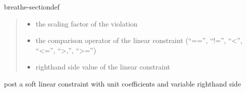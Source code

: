 \documentclass[letterpaper,10pt,openany,oneside,english]{sphinxmanual}
\begin{document}
\begin{fulllineitems}
\begin{sphinxuseclass}{breathe-sectiondef}
\begin{fulllineitems}
\begin{quote}
\begin{description}
\begin{itemize}
\item {} 
\sphinxAtStartPar
{} \textendash{} the scaling factor of the violation 

\item {} 
\sphinxAtStartPar
{} \textendash{} the comparison operator of the linear constraint (“==”, “!=”, “\textless{}”, “\textless{}=”, “\textgreater{},”, “\textgreater{}=”) 

\item {} 
\sphinxAtStartPar
{} \textendash{} right\sphinxhyphen{}hand side value of the linear constraint 

\end{itemize}

\end{description}\end{quote}

\end{fulllineitems}


\begin{fulllineitems}
\label{\detokenize{ref/ref_cpp:_CPPv4N11WeightedCSP11postWVarSumEPii6string4Cost6stringi}}\label{\detokenize{ref/ref_cpp:_CPPv3N11WeightedCSP11postWVarSumEPii6string4Cost6stringi}}\label{\detokenize{ref/ref_cpp:_CPPv2N11WeightedCSP11postWVarSumEPii6string4Cost6stringi}}\label{\detokenize{ref/ref_cpp:WeightedCSP::postWVarSum__iP.i.string.Cost.string.i}}
\pysigstartsignatures
\pysigstartmultiline
{}
\pysigstopmultiline
\pysigstopsignatures
\sphinxAtStartPar
post a soft linear constraint with unit coefficients and variable right\sphinxhyphen{}hand side 


\end{fulllineitems}
\end{sphinxuseclass}
\end{fulllineitems}
\end{document}

